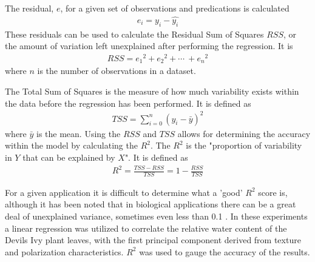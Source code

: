 The residual, $e$, for a given set of observations and predications is calculated
%
\begin{align}
    e_i = y_i - \hat{y_i}
\end{align}
%
These residuals can be used to calculate the Residual Sum of Squares \(RSS\), or the amount of variation left unexplained after performing the regression.  It is
\begin{align}
    RSS = {e_1}^2 + {e_2}^2 + \cdots\ + {e_n}^2
\end{align}
where $n$ is the number of observations in a dataset.

The Total Sum of Squares is the measure of how much variability exists within the data before the regression has been performed.  It is defined as
\begin{align}
    TSS = \sum_{i=0}^n (y_i - \bar{y})^2
\end{align}
where $\bar{y}$ is the mean.  Using the $RSS$ and $TSS$ allows for determining the accuracy within the model by calculating the $R^2$.  The $R^2$ is the "proportion of variability in $Y$ that can be explained by $X$". It is defined as
\begin{align}
    R^2 = \frac{TSS - RSS}{TSS} = 1 - \frac{RSS}{TSS}
\end{align}

For a given application it is difficult to determine what a 'good' $R^2$ score is, although it has been noted that in biological applications there can be a great deal of unexplained variance, sometimes even less than 0.1 \cite{stats}.  In these experiments a linear regression was utilized to correlate the relative water content of the Devils Ivy plant leaves, with the first principal component derived from texture and polarization characteristics.  $R^2$ was used to gauge the accuracy of the results.

